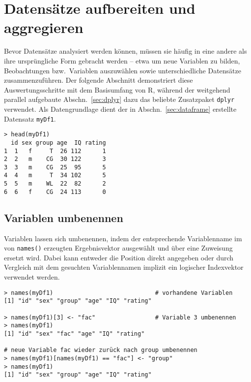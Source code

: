 \section{Datensätze aufbereiten und aggregieren}
\label{sec:dfTransform}

Bevor Datensätze analysiert werden können, müssen sie häufig in eine andere als ihre ursprüngliche Form gebracht werden -- etwa um neue Variablen zu bilden, Beobachtungen bzw.\ Variablen auszuwählen sowie unterschiedliche Datensätze zusammenzuführen. Der folgende Abschnitt demonstriert diese Auswertungsschritte mit dem Basisumfang von R, während der weitgehend parallel aufgebaute Abschn.\ \ref{sec:dplyr} dazu das beliebte Zusatzpaket \lstinline!dplyr! verwendet. Als Datengrundlage dient der in Abschn.\ \ref{sec:dataframe} erstellte Datensatz \lstinline!myDf1!.
\begin{lstlisting}
> head(myDf1)
  id sex group age  IQ rating
1  1   f     T  26 112      1
2  2   m    CG  30 122      3
3  3   m    CG  25  95      5
4  4   m     T  34 102      5
5  5   m    WL  22  82      2
6  6   f    CG  24 113      0
\end{lstlisting}

\subsection{Variablen umbenennen}
\label{sec:df_rename}

Variablen lassen sich umbenennen, indem der entsprechende Variablenname im von \lstinline!names()! erzeugten Ergebnisvektor ausgewählt und über eine Zuweisung ersetzt wird. Dabei kann entweder die Position direkt angegeben oder durch Vergleich mit dem gesuchten Variablennamen implizit ein logischer Indexvektor verwendet werden.
\begin{lstlisting}
> names(myDf1)                             # vorhandene Variablen
[1] "id" "sex" "group" "age" "IQ" "rating"

> names(myDf1)[3] <- "fac"                 # Variable 3 umbenennen
> names(myDf1)
[1] "id" "sex" "fac" "age" "IQ" "rating"

# neue Variable fac wieder zurück nach group umbenennen
> names(myDf1)[names(myDf1) == "fac"] <- "group"
> names(myDf1)
[1] "id" "sex" "group" "age" "IQ" "rating"
\end{lstlisting}

